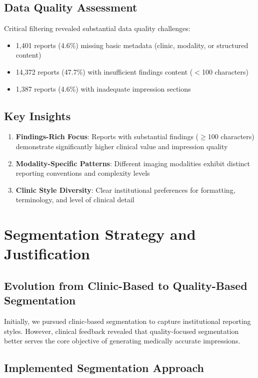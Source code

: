 \documentclass[11pt,letterpaper]{article}
\begin{document}
\subsection{Data Quality Assessment}
Critical filtering revealed substantial data quality challenges:
\begin{itemize}
    \item 1,401 reports (4.6\%) missing basic metadata (clinic, modality, or structured content)
    \item 14,372 reports (47.7\%) with insufficient findings content ($<$100 characters)
    \item 1,387 reports (4.6\%) with inadequate impression sections
\end{itemize}

\subsection{Key Insights}
\begin{enumerate}
    \item \textbf{Findings-Rich Focus}: Reports with substantial findings ($\geq$100 characters) demonstrate significantly higher clinical value and impression quality
    \item \textbf{Modality-Specific Patterns}: Different imaging modalities exhibit distinct reporting conventions and complexity levels
    \item \textbf{Clinic Style Diversity}: Clear institutional preferences for formatting, terminology, and level of clinical detail
\end{enumerate}

\section{Segmentation Strategy and Justification}

\subsection{Evolution from Clinic-Based to Quality-Based Segmentation}

Initially, we pursued clinic-based segmentation to capture institutional reporting styles. However, clinical feedback revealed that quality-focused segmentation better serves the core objective of generating medically accurate impressions.

\subsection{Implemented Segmentation Approach}
\end{document}
